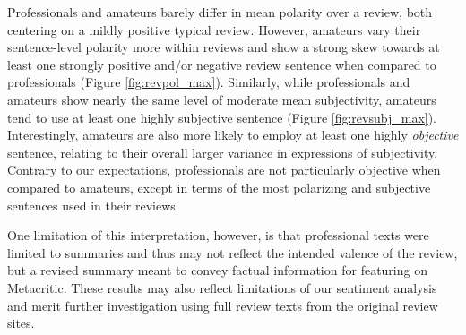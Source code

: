 \documentclass[letterpaper]{article}
\begin{document}
Professionals and amateurs barely differ in mean polarity over a review, both centering on a mildly positive typical review. However, amateurs vary their sentence-level polarity more within reviews and show a strong skew towards at least one strongly positive and/or negative review sentence when compared to professionals (Figure \ref{fig:revpol_max}). Similarly, while professionals and amateurs show nearly the same level of moderate mean subjectivity, amateurs tend to use at least one highly subjective sentence (Figure \ref{fig:revsubj_max}). Interestingly, amateurs are also more likely to employ at least one highly \textit{objective} sentence, relating to their overall larger variance in expressions of subjectivity. Contrary to our expectations, professionals are not particularly objective when compared to amateurs, except in terms of the most polarizing and subjective sentences used in their reviews.

One limitation of this interpretation, however, is that professional texts were limited to summaries and thus may not reflect the intended valence of the review, but a revised summary meant to convey factual information for featuring on Metacritic. These results may also reflect limitations of our sentiment analysis and merit further investigation using full review texts from the original review sites.
\end{document}
